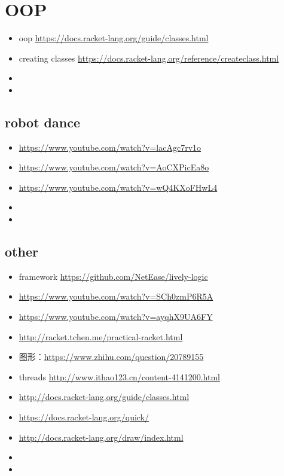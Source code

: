 \documentclass[9pt,b5paper]{article}
\begin{document}
\section{OOP}
\label{sec-3}
\begin{itemize}
\item oop \url{https://docs.racket-lang.org/guide/classes.html}
\item creating classes \url{https://docs.racket-lang.org/reference/createclass.html}
\item 
\item 
\end{itemize}

\subsection{robot dance}
\label{sec-3-1}
\begin{itemize}
\item \url{https://www.youtube.com/watch?v=lacAgc7rv1o}
\item \url{https://www.youtube.com/watch?v=AoCXPicEa8o}
\item \url{https://www.youtube.com/watch?v=wQ4KXoFHwL4}
\item 
\item 
\end{itemize}

\subsection{other}
\label{sec-3-2}
\begin{itemize}
\item framework \url{https://github.com/NetEase/lively-logic}
\item \url{https://www.youtube.com/watch?v=SCh0zmP6R5A}
\item \url{https://www.youtube.com/watch?v=ayqhX9UA6FY}
\item \url{http://racket.tchen.me/practical-racket.html}
\item 图形：\url{https://www.zhihu.com/question/20789155}
\item threads \url{http://www.ithao123.cn/content-4141200.html}
\item \url{http://docs.racket-lang.org/guide/classes.html}
\item \url{https://docs.racket-lang.org/quick/}
\item \url{http://docs.racket-lang.org/draw/index.html}
\item 
\item 
\end{itemize}
\end{document}
